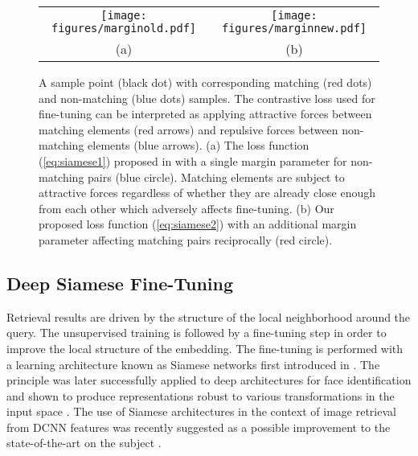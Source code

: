 \documentclass[10pt,twocolumn,letterpaper]{article}
\begin{document}
\begin{figure}
	\centering %
		\begin{tabular}{@{}c@{} @{}c@{}}
			\texttt{[image: figures/marginold.pdf]} &
			\texttt{[image: figures/marginnew.pdf]} \\
			(a) & (b)
		\end{tabular}
		\caption{\footnotesize A sample point (black dot) with corresponding matching (red dots) and non-matching (blue dots) samples.
The contrastive loss used for fine-tuning can be interpreted as applying attractive forces between matching elements (red arrows) and repulsive forces between non-matching elements (blue arrows).
(a) The loss function (\ref{eq:siamese1}) proposed in \cite{Siamese} with a single margin parameter for non-matching pairs (blue circle). Matching elements are subject to attractive forces regardless of whether they are already close enough from each other which adversely affects fine-tuning.
(b) Our proposed loss function (\ref{eq:siamese2}) with an additional margin parameter affecting matching pairs reciprocally (red circle).}
	\label{fig:margin1}
\end{figure}


\subsection{Deep Siamese Fine-Tuning}

Retrieval results are driven by the structure of the local neighborhood around the query.
The unsupervised training is followed by a fine-tuning step in order to improve the local structure of the embedding.
The fine-tuning is performed with a learning architecture known as Siamese networks first introduced in \cite{siamesenetwork}.
The principle was later successfully applied to deep architectures for face identification \cite{chopra2005} and shown to produce representations robust to various transformations in the input space \cite{Siamese}.
The use of Siamese architectures in the context of image retrieval from DCNN features was recently suggested as a possible improvement to the state-of-the-art on the subject \cite{Yandex}. 
\end{document}
